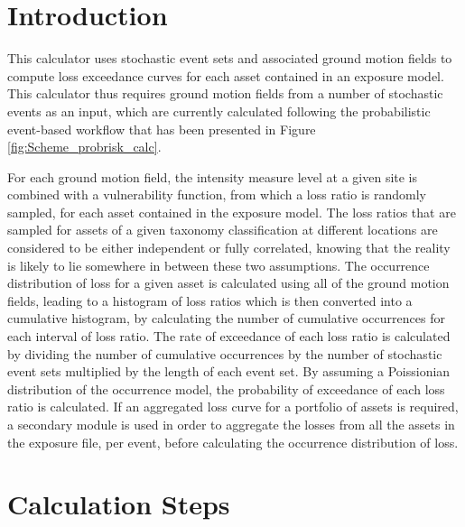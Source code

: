\section{Introduction}
This calculator uses stochastic event sets and associated ground motion fields to compute loss exceedance curves for each asset contained in an exposure model. This calculator thus requires ground motion fields from a number of stochastic events as an input, which are currently calculated following the probabilistic event-based workflow that has been presented in Figure \ref{fig:Scheme_probrisk_calc}.

For each ground motion field, the intensity measure level at a given site is combined with a vulnerability function, from which a loss ratio is randomly sampled, for each asset contained in the exposure model. The loss ratios that are sampled for assets of a given taxonomy classification at different locations are considered to be either independent or fully correlated, knowing that the reality is likely to lie somewhere in between these two assumptions. The occurrence distribution of loss for a given asset is calculated using all of the ground motion fields, leading to a histogram of loss ratios which is then converted into a cumulative histogram, by calculating the number of cumulative occurrences for each interval of loss ratio. The rate of exceedance of each loss ratio is calculated by dividing the number of cumulative occurrences by the number of stochastic event sets multiplied by the length of each event set. By assuming a Poissionian distribution of the occurrence model, the probability of exceedance of each loss ratio is calculated. If an aggregated loss curve for a portfolio of assets is required, a secondary module is used in order to aggregate the losses from all the assets in the exposure file, per event, before calculating the occurrence distribution of loss. 

\section{Calculation Steps}

